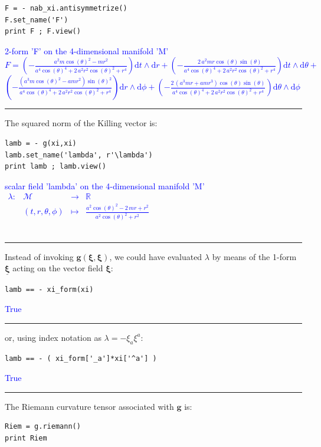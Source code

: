 \documentclass[a4paper]{jpconf}
\newcommand{\w}[1]{\bm{#1}}
\newcommand{\soutput}[1]{\textcolor{blue}{#1}\\[-0.8ex]\rule{\textwidth}{0.4pt}}
\begin{document}
\begin{verbatim}
F = - nab_xi.antisymmetrize()
F.set_name('F')
print F ; F.view()
\end{verbatim}
\soutput{2-form 'F' on the 4-dimensional manifold 'M'\\[1ex]
$F = \left( -\frac{a^{2} m \cos\left(\theta\right)^{2} - m r^{2}}{a^{4}
\cos\left(\theta\right)^{4} + 2 \, a^{2} r^{2}
\cos\left(\theta\right)^{2} + r^{4}} \right) \mathrm{d} t\wedge
\mathrm{d} r + \left( -\frac{2 \, a^{2} m r \cos\left(\theta\right)
\sin\left(\theta\right)}{a^{4} \cos\left(\theta\right)^{4} + 2 \, a^{2}
r^{2} \cos\left(\theta\right)^{2} + r^{4}} \right) \mathrm{d} t\wedge
\mathrm{d} \theta + $\\
$\left( -\frac{{\left(a^{3} m
\cos\left(\theta\right)^{2} - a m r^{2}\right)}
\sin\left(\theta\right)^{2}}{a^{4} \cos\left(\theta\right)^{4} + 2 \,
a^{2} r^{2} \cos\left(\theta\right)^{2} + r^{4}} \right) \mathrm{d}
r\wedge \mathrm{d} \phi + \left( -\frac{2 \, {\left(a^{3} m r + a m
r^{3}\right)} \cos\left(\theta\right) \sin\left(\theta\right)}{a^{4}
\cos\left(\theta\right)^{4} + 2 \, a^{2} r^{2}
\cos\left(\theta\right)^{2} + r^{4}} \right) \mathrm{d} \theta\wedge
\mathrm{d} \phi$}
The squared norm of the Killing vector is:
\begin{verbatim}
lamb = - g(xi,xi)
lamb.set_name('lambda', r'\lambda')
print lamb ; lamb.view()
\end{verbatim}
\soutput{scalar field 'lambda' on the 4-dimensional manifold 'M'\\[1ex]
$\begin{array}{llcl} \lambda:& \mathcal{M} & \longrightarrow
& \mathbb{R} \\ & \left(t, r, \theta, \phi\right) & \longmapsto
& \frac{a^{2} \cos\left(\theta\right)^{2} - 2 \, m r + r^{2}}{a^{2}
\cos\left(\theta\right)^{2} + r^{2}} \end{array}$\\[-1ex]}
Instead of invoking $\w{g}(\w{\xi},\w{\xi})$, we could have evaluated $\lambda$ 
by means of the 1-form $\w{\underline{\xi}}$ acting on the vector field $\w{\xi}$:
\begin{verbatim}
lamb == - xi_form(xi)
\end{verbatim}
\soutput{True}
or, using index notation as $\lambda = - \xi_a \xi^a$:
\begin{verbatim}
lamb == - ( xi_form['_a']*xi['^a'] )
\end{verbatim}
\soutput{True}
The Riemann curvature tensor associated with $\w{g}$ is:
\begin{verbatim}
Riem = g.riemann()
print Riem
\end{verbatim}
\end{document}
